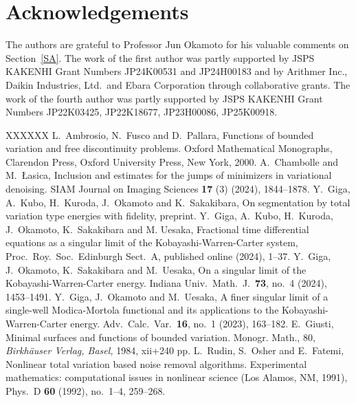\documentclass[12pt, reqno]{amsart}
\numberwithin{equation}{section}
\begin{document}
\section*{Acknowledgements}
The authors are grateful to Professor Jun Okamoto for his valuable comments on Section~\ref{SA}.
 The work of the first author was partly supported by JSPS KAKENHI Grant Numbers JP24K00531 and JP24H00183 and by Arithmer Inc., Daikin Industries, Ltd.\ and Ebara Corporation through collaborative grants.
 The work of the fourth author was partly supported by JSPS KAKENHI Grant Numbers JP22K03425, JP22K18677, JP23H00086, JP25K00918.
%
\begin{thebibliography}{XXXXXX}
%
L.\ Ambrosio, N.\ Fusco and D.\ Pallara, 
Functions of bounded variation and free discontinuity problems. 
Oxford Mathematical Monographs, Clarendon Press, 
Oxford University Press, New York, 2000.
%
A.\ Chambolle and M.\ \L asica, 
Inclusion and estimates for the jumps of minimizers in variational denoising. 
SIAM Journal on Imaging Sciences {\bf17} (3) (2024), 1844--1878.
%
Y.\ Giga, A.\ Kubo, H.\ Kuroda, J.\ Okamoto and K.\ Sakakibara, 
On segmentation by total variation type energies with fidelity, 
preprint.
%
Y.\ Giga, A.\ Kubo, H.\ Kuroda, J.\ Okamoto, K.\ Sakakibara and M. Uesaka, 
Fractional time differential equations as a singular limit of the Kobayashi-Warren-Carter system, 
Proc.\ Roy.\ Soc.\ Edinburgh Sect.\ A, published online (2024), 1--37.
%
Y.\ Giga, J.\ Okamoto, K.\ Sakakibara and M.\ Uesaka, 
On a singular limit of the Kobayashi-Warren-Carter energy. Indiana Univ.\ Math.\ J.\ {\bf73}, no.\ 4 (2024), 1453--1491.
%
Y.\ Giga, J.\ Okamoto and M.\ Uesaka, 
A finer singular limit of a single-well Modica-Mortola functional and its applications to the Kobayashi-Warren-Carter energy. 
Adv.\ Calc.\ Var.\ {\bf16}, no.\ 1 (2023), 163--182.
%
E.\ Giusti, 
Minimal surfaces and functions of bounded variation. 
Monogr. Math., 80, 
\emph{Birkh\"auser Verlag, Basel,} 1984, x\hspace{-1pt}i\hspace{-1pt}i+240 pp.
%
L.\ Rudin, S.\ Osher and E.\ Fatemi, 
Nonlinear total variation based noise removal algorithms. 
Experimental mathematics: computational issues in nonlinear science (Los Alamos, NM, 1991), 
Phys.\ D {\bf60} (1992), no.\ 1--4, 259--268.
%
\end{thebibliography}
\end{document}
